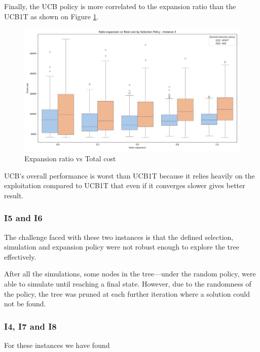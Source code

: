 Finally, the UCB policy is more correlated to the expansion ratio than the UCB1T as shown on Figure \ref{fig:ratio_vs_cost_3}.
\begin{figure}[!ht]
    \centering
    \includegraphics[width=\textwidth]{Figures/3 - ratio_vs_cost.png}
    \caption{Expansion ratio vs Total cost}
    \label{fig:ratio_vs_cost_3}
\end{figure}

UCB's overall performance is worst than UCB1T because it relies heavily on the exploitation compared to UCB1T that even if it converges slower gives better result.


\subsubsection{I5 and I6}

The challenge faced with these two instances is that the defined selection, simulation and expansion policy were not robust enough to explore the tree effectively.

After all the simulations, some nodes in the tree—under the random policy, were able to simulate until reaching a final state. However, due to the randomness of the policy, the tree was pruned at each further iteration where a solution could not be found.

\subsubsection{I4, I7 and I8}

For these instances we have found